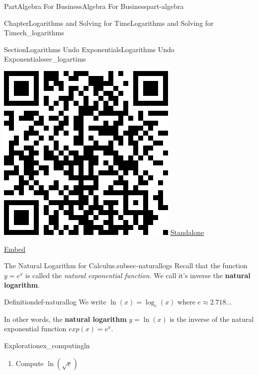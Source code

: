 \documentclass[oneside,10pt,]{tufte-book}
\newcommand{\terminology}[1]{\textbf{#1}}
\numberwithin{equation}{chapter}
\begin{document}
\begin{partptx}{Part}{Algebra For Business}{}{Algebra For Business}{}{}{part-algebra}
\begin{chapterptx}{Chapter}{Logarithms and Solving for Time}{}{Logarithms and Solving for Time}{}{}{ch_logarithms}
\begin{sectionptx}{Section}{Logarithms Undo Exponentials}{}{Logarithms Undo Exponentials}{}{}{sec_logartims}
\begin{sidebyside}{2}{0.075}{0.075}{0.17}
\begin{sbspanel}{0.21}
\includegraphics[width=\linewidth]{generated/qrcode/sec_logartims-9.png}
\href{http://webwork.bridgew.edu/oer/functions_at_work/sec_logartims-9.html}{Standalone}%
\par
\href{http://webwork.bridgew.edu/oer/functions_at_work/sec_logartims-9-if.html}{Embed}%
\end{sbspanel}%
\end{sidebyside}%
\begin{paragraphs}{The Natural Logarithm for Calculus.}{subsec-naturallogs}%
Recall that the function \(y = e^x\) is called the \emph{natural exponential function}.  We call it's inverse the \terminology{natural logarithm}.%
\begin{definition}{Definition}{}{def-naturallog}%
We write \(\ln(x) = \log_e(x)\) where \(e\approx 2.718\dots\)%
\par
In other words, the \terminology{natural logarithm} \(y = \ln(x)\) is the inverse of the natural exponential function \(exp(x) = e^x\).%
\end{definition}
\begin{exploration}{Exploration}{}{ex_computingln}%
\begin{enumerate}[font=\bfseries,label=(\alph*),ref=\alph*]%
\item{}Compute \(\ln(\sqrt{e})\)%
\par\smallskip%

\end{enumerate}
\end{exploration}
\end{paragraphs}
\end{sectionptx}
\end{chapterptx}
\end{partptx}
\end{document}
